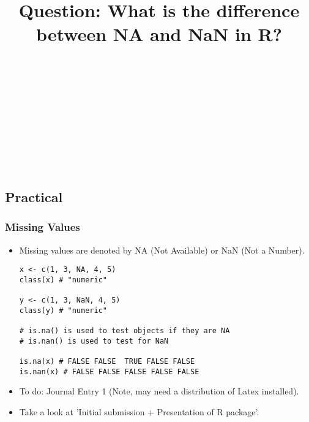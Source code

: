 \documentclass[11pt]{beamer}
\newcommand{\docYear}{\text{2022}} %
\newcommand{\aUthor}{\text{Anjali Silva}}
\newcommand{\courseCodeName}{\text{BCB410H1: Applied Bioinformatics }}
\newcommand{\anyQuestions}{\text{Any questions?}}
\begin{document}
\subsection{Practical}
\begin{frame}[fragile]
\frametitle{Missing Values}
\begin{itemize}
\item Missing values are denoted by NA (Not Available) or NaN (Not a Number).
\vspace{0.1in}
\begin{itemize}
\begin{verbatim} 
x <- c(1, 3, NA, 4, 5)
class(x) # "numeric"

y <- c(1, 3, NaN, 4, 5)
class(y) # "numeric"

# is.na() is used to test objects if they are NA
# is.nan() is used to test for NaN

is.na(x) # FALSE FALSE  TRUE FALSE FALSE
is.nan(x) # FALSE FALSE FALSE FALSE FALSE
\end{verbatim}
\end{itemize}
\end{itemize}
\end{frame}



\title[\courseCodeName\docYear]{Question: What is the difference between NA and NaN in {\sf R}?}
\author[\aUthor]{}
\date{\vspace{0.5cm} \\ \\
\\
\\ \vspace{0.5cm} } 


\begin{frame}
\titlepage
\end{frame}



\title[\courseCodeName \docYear]{\anyQuestions}
\author[\aUthor]{}
\date{\vspace{0.5cm} \\ \\
\\
\\ \vspace{0.5cm} } 


\begin{frame}
\titlepage
\begin{itemize}
\item To do: Journal Entry 1 (Note, may need a distribution of Latex installed). 
\item Take a look at 'Initial submission + Presentation of R package'.
\end{itemize}
\end{frame}
\end{document}
